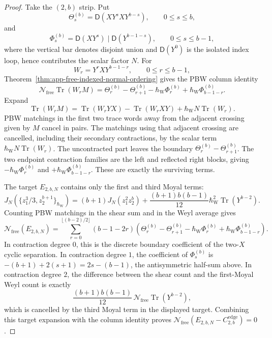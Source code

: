 \begin{proof}
  Take the \((2,b)\) strip.  Put
  \[
    \Theta_s^{(b)}=\mathsf D(XY^sXY^{b-s}),
    \qquad 0\leq s\leq b,
  \]
  and
  \[
    \Phi_s^{(b)}
    =
    \mathsf D(XY^s)\mid\mathsf D(Y^{b-1-s}),
    \qquad 0\leq s\leq b-1,
  \]
  where the vertical bar denotes disjoint union and
  \(\mathsf D(Y^0)\) is the isolated index loop, hence contributes the
  scalar factor \(N\).  For
  \[
    W_r=Y^rXY^{b-1-r},\qquad 0\leq r\leq b-1,
  \]
  Theorem~\ref{thm:app-free-indexed-normal-ordering} gives the PBW
  column identity
  \[
    \mathcal N_{\mathrm{free}}\operatorname{Tr}(W_rM)
    =
    \Theta_r^{(b)}-\Theta_{r+1}^{(b)}
    -\hbar_{\mathrm{W}}\Phi_r^{(b)}
    +\hbar_{\mathrm{W}}\Phi_{b-1-r}^{(b)}.
  \]
  Expand
  \[
    \operatorname{Tr}(W_rM)
    =
    \operatorname{Tr}(W_rYX)
    -\operatorname{Tr}(W_rXY)
    +\hbar_{\mathrm{W}} N\operatorname{Tr}(W_r).
  \]
  PBW matchings in the first two trace words away from the
  adjacent crossing given by \(M\) cancel in pairs.  The matchings
  using that adjacent crossing are cancelled, including their secondary
  contractions, by the scalar term \(\hbar_{\mathrm{W}} N\operatorname{Tr}(W_r)\).
  The uncontracted part leaves the boundary
  \(\Theta_r^{(b)}-\Theta_{r+1}^{(b)}\).  The two endpoint contraction
  families are the left and reflected right blocks, giving
  \(-\hbar_{\mathrm{W}}\Phi_r^{(b)}\) and \(+\hbar_{\mathrm{W}}\Phi_{b-1-r}^{(b)}\).  These are
  exactly the surviving terms.

  The target \(E_{2,b,N}\) contains only the first and third Moyal
  terms:
  \[
    J_N\!\left(
      \{z_1^3/3,z_2^{b+1}\}_{\hbar_{\mathrm{W}}}
    \right)
    =
    (b+1)J_N(z_1^2z_2^b)
    +\frac{(b+1)b(b-1)}{12}\hbar_{\mathrm{W}}^2\operatorname{Tr}(Y^{b-2}).
  \]
  Counting PBW matchings in the shear sum and in the Weyl average gives
  \[
    \mathcal N_{\mathrm{free}}(E_{2,b,N})
    =
    \sum_{r=0}^{\lfloor(b-2)/2\rfloor}
      (b-1-2r)
      \left(
        \Theta_r^{(b)}-\Theta_{r+1}^{(b)}
        -\hbar_{\mathrm{W}}\Phi_r^{(b)}
        +\hbar_{\mathrm{W}}\Phi_{b-1-r}^{(b)}
      \right).
  \]
  In contraction degree \(0\), this is the discrete boundary coefficient
  of the two-\(X\) cyclic separation.  In contraction degree \(1\), the
  coefficient of \(\Phi_s^{(b)}\) is
  \(-(b+1)+2(s+1)=2s-(b-1)\), the antisymmetric half-sum above.  In
  contraction degree \(2\), the difference between the shear count and
  the first-Moyal Weyl count is exactly
  \[
    \frac{(b+1)b(b-1)}{12}\,
    \mathcal N_{\mathrm{free}}\operatorname{Tr}(Y^{b-2}),
  \]
  which is cancelled by the third Moyal term in the displayed target.
  Combining this target expansion with the column identity proves
  \(\mathcal N_{\mathrm{free}}(E_{2,b,N}-C^{\mathrm{edge}}_{2,b})=0\).


\end{proof}
